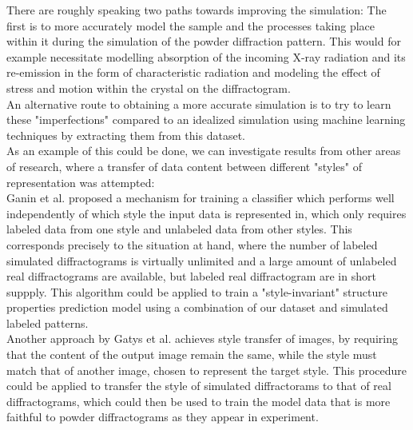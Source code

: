 There are roughly speaking two paths towards improving the simulation: The first is to more accurately model the sample and the processes taking place within it during the simulation of the powder diffraction pattern. This would for example necessitate modelling absorption of the incoming X-ray radiation and its re-emission in the form of characteristic radiation and modeling the effect of stress and motion within the crystal on the diffractogram. \\
An alternative route to obtaining a more accurate simulation is to try to learn these "imperfections" compared to an idealized simulation using machine learning techniques by extracting them from this dataset. \\
As an example of this could be done, we can investigate results from other areas of research, where a transfer of data content between different "styles" of representation was attempted: \\
Ganin et al.\cite{Ganin2015} proposed a mechanism for training a classifier which performs well independently of which style the input data is represented in, which only requires labeled data from one style and unlabeled data from other styles. This corresponds precisely to the situation at hand, where the number of labeled simulated diffractograms is virtually unlimited and a large amount of unlabeled real diffractograms are available, but labeled real diffractogram are in short suppply. This algorithm could be applied to train a "style-invariant" structure properties prediction model using a combination of our dataset and simulated labeled patterns. \\
Another approach by Gatys et al. \cite{Gatys2016} achieves style transfer of images, by requiring that the content of the output image remain the same, while the style must match that of another image, chosen to represent the target style. This procedure could be applied to transfer the style of simulated diffractorams to that of real diffractograms, which could then be used to train the model data that is more faithful to powder diffractograms as they appear in experiment.



